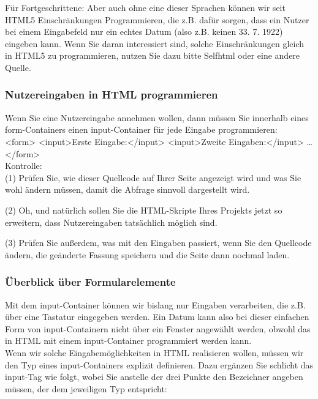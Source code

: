 Für Fortgeschrittene: Aber auch ohne eine dieser Sprachen können wir seit HTML5 Einschränkungen Programmieren, die z.B. dafür sorgen, dass ein Nutzer bei einem Eingabefeld nur ein echtes Datum (also z.B. keinen 33. 7. 1922) eingeben kann. Wenn Sie daran interessiert sind, solche Einschränkungen gleich in HTML5 zu programmieren, nutzen Sie dazu bitte Selfhtml oder eine andere Quelle.

\subsubsection{Nutzereingaben in HTML programmieren}

Wenn Sie eine Nutzereingabe annehmen wollen, dann müssen Sie innerhalb eines form-Containers einen input-Container für jede Eingabe programmieren:\\

<form>
<input>Erste Eingabe:</input>
<input>Zweite Eingaben:</input>
… 
</form>\\

Kontrolle:\\

(1)	Prüfen Sie, wie dieser Quellcode auf Ihrer Seite angezeigt wird und was Sie wohl ändern müssen, damit die Abfrage sinnvoll dargestellt wird.

(2)	Oh, und natürlich sollen Sie die HTML-Skripte Ihres Projekts jetzt so erweitern, dass Nutzereingaben tatsächlich möglich sind.

(3)	Prüfen Sie außerdem, was mit den Eingaben passiert, wenn Sie den Quellcode ändern, die geänderte Fassung speichern und die Seite dann nochmal laden.

\subsubsection{Überblick über Formularelemente}

Mit dem input-Container können wir bislang nur Eingaben verarbeiten, die z.B. über eine Tastatur eingegeben werden. Ein Datum kann also bei dieser einfachen Form von input-Containern nicht über ein Fenster angewählt werden, obwohl das in HTML mit einem input-Container programmiert werden kann. \\

Wenn wir solche Eingabemöglichkeiten in HTML realisieren wollen, müssen wir den Typ eines input-Containers explizit definieren. Dazu ergänzen Sie schlicht das input-Tag wie folgt, wobei Sie anstelle der drei Punkte den Bezeichner angeben müssen, der dem jeweiligen Typ entspricht:\\

